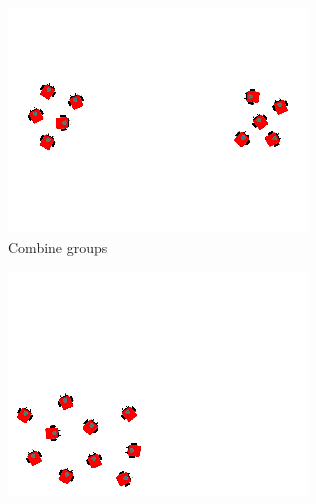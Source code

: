 \documentclass[]{article}
\begin{document}
	
\begin{figure}
	\ContinuedFloat
	\centering		
	\begin{subfigure}{0.42\textwidth}
		\centering
		\includegraphics[width=\linewidth]{slide_images/Swarm_Robot_Control_-_10_Robot_0019.png}
		\caption{Combine groups}
		\label{fig:sub1}
	\end{subfigure}%
	\begin{subfigure}{0.42\textwidth}
		\centering
		\includegraphics[width=\linewidth]{slide_images/Swarm_Robot_Control_-_10_Robot_0021.png}
		\caption{}
		\label{fig:sub2}
	\end{subfigure}
	\begin{subfigure}{0.42\textwidth}
		\centering

\end{subfigure}
\end{figure}
\end{document}
